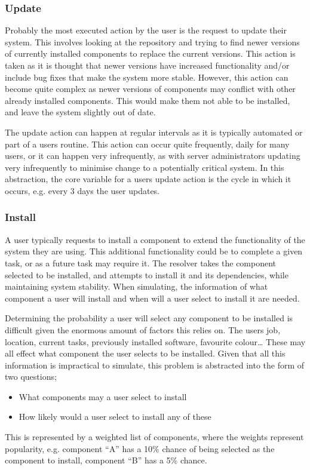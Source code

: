 \subsubsection{Update}
Probably the most executed action by the user is the request to update their system.
This involves looking at the repository and trying to find newer versions of currently installed components to replace the current versions.
This action is taken as it is thought that newer versions have increased functionality and/or include bug fixes that make the system more stable.
However, this action can become quite complex as newer versions of components may conflict with other already installed components.
This would make them not able to be installed, and leave the system slightly out of date.

The update action can happen at regular intervals as it is typically automated or part of a users routine.
This action can occur quite frequently, daily for many users, 
or it can happen very infrequently, 
as with server administrators updating very infrequently to minimise change to a potentially critical system.
In this abstraction, the core variable for a users update action is the cycle in which it occurs,
e.g. every 3 days the user updates.

\subsubsection{Install}
A user typically requests to install a component to extend the functionality of the system they are using.
This additional functionality could be to complete a given task, or as a future task may require it. 
The resolver takes the component selected to be installed, and attempts to install it and its dependencies, while maintaining system stability.
When simulating, the information of what component a user will install and when will a user select to install it are needed. 

Determining the probability a user will select any component to be installed is difficult given the enormous amount of factors this relies on.
The users job, location, current tasks, previously installed software, favourite colour\ldots 
These may all effect what component the user selects to be installed.
Given that all this information is impractical to simulate, this problem is abstracted into the form of two questions;
\begin{itemize}
  \item What components may a user select to install
  \item How likely would a user select to install any of these
\end{itemize}
This is represented by a weighted list of components, where the weights represent popularity,
e.g. component ``A'' has a 10\% chance of being selected as the component to install, component ``B'' has a 5\% chance.

